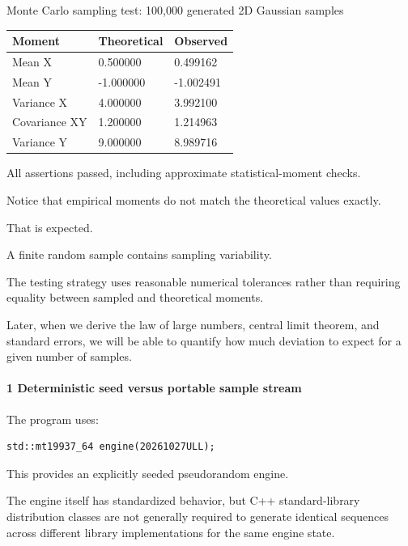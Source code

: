 Monte Carlo sampling test: 100,000 generated 2D Gaussian samples

{\def\LTcaptype{none} %
\begin{longtable}[]{@{}lll@{}}
\toprule\noalign{}
Moment & Theoretical & Observed \\
\midrule\noalign{}
\endhead
\bottomrule\noalign{}
\endlastfoot
Mean X & 0.500000 & 0.499162 \\
Mean Y & -1.000000 & -1.002491 \\
Variance X & 4.000000 & 3.992100 \\
Covariance XY & 1.200000 & 1.214963 \\
Variance Y & 9.000000 & 8.989716 \\
\end{longtable}
}

All assertions passed, including approximate statistical-moment checks.

Notice that empirical moments do not match the theoretical values exactly.

That is expected.

A finite random sample contains sampling variability.

The testing strategy uses reasonable numerical tolerances rather than requiring equality between sampled and theoretical moments.

Later, when we derive the law of large numbers, central limit theorem, and standard errors, we will be able to quantify how much deviation to expect for a given number of samples.

\paragraph{1 Deterministic seed versus portable sample stream}\label{02-foundations-ii-ch039-deterministic-seed-versus-portable-sample-stream}

\hypertarget{02-foundations-ii-ch039-deterministic-seed-versus-portable-sample-stream}{}

The program uses:

\begin{verbatim}
std::mt19937_64 engine(20261027ULL);
\end{verbatim}

This provides an explicitly seeded pseudorandom engine.

The engine itself has standardized behavior, but C++ standard-library distribution classes are not generally required to generate identical sequences across different library implementations for the same engine state.

